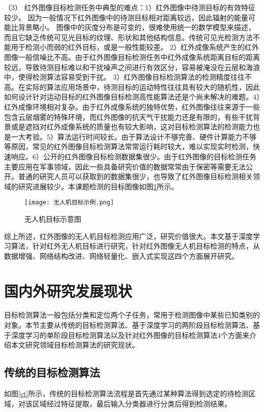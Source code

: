 （3） 红外图像目标检测任务中典型的难点：1）红外图像中待测目标的有效特征较少。
因为一般情况下红外图像中的待测目标相对距离较远，因此辐射的能量可能比背景略小。
图像中的灰度分布是可变的，很难使用统一的数学模型来描述，而且它缺乏传统可见光目标的纹理、形状和其他结构信息。传统可见光检测方法不能用于检测小而弱的红外目标，或是一般性能较差。 2）红外成像系统产生的红外图像一般信噪比不高。由于红外图像目标检测任务中红外成像系统距离目标的距离较远，导致待测目标难以和干扰噪声之间进行有效区分，容易被淹没在云层和海浪中，使得检测算法容易受到干扰。 3）红外图像目标检测算法的检测精度往往不高。在实际的算法应用场景中，待测目标的运动特性往往具有较大的随机性，因此如何设计针对运动目标的红外图像目标检测高性能算法还是个尚未解决的难题。4）红外成像环境相对复杂。由于红外成像系统的独特优势，红外图像往往来源于一些包含云层烟雾的特殊环境，而红外图像的抗天气干扰能力还是有限的，有些干扰背景或是遮挡对红外成像系统的质量也有较大影响，这对目标检测算法的检测能力也是一大考验。5）算法运行时间较长。由于算法设计不够完善、硬件计算能力不够等原因，常见的红外图像目标检测算法常常运行耗时较大，难以实现实时检测，快速响应。6）公开的红外图像目标检测数据集很少。由于红外图像的目标检测任务主要应用在军事领域，因此一些具备研究价值的数据常常由于保密等需要无法公开。普通的研究人员可以获取到的数据集很少，也导致了红外图像目标检测相关领域的研究进展较少。本课题检测的目标图像如图\ref{uav}所示。

\begin{figure}[htbp]
    \centering
    \texttt{[image: 无人机目标示例.png]}
    \caption{无人机目标示意图}
    \label{uav}
\end{figure}

综上所述，红外图像的无人机目标检测应用广泛，研究价值很大。本文基于深度学习算法，针对红外无人机目标进行研究，针对红外图像无人机目标检测的特点，从数据增强、网络结构改进、网络轻量化、嵌入式实现这四个方面展开研究。

\section{国内外研究发展现状}
目标检测算法一般包括分类和定位两个子任务，常用于检测图像中某些已知类别的对象。本节主要从传统的目标检测算法、基于深度学习的两阶段目标检测算法、基于深度学习的单阶段目标检测算法以及针对红外图像的目标检测算法4个方面来介绍本文研究领域目标检测算法的研究现状\cite{尹宏鹏2016基于视觉的目标检测与跟踪综述}。

\subsection{传统的目标检测算法}
如图\ref{ct}所示，传统的目标检测算法流程是首先通过某种算法得到选定的待检测区域，对该区域经过特征提取，最后输入分类器进行分类后得到检测结果。


